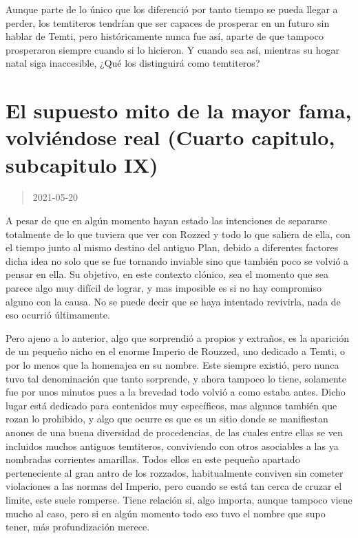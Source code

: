 \documentclass[
  spanish,
]{book}
\begin{document}
Aunque parte de lo único que los diferenció por tanto tiempo se pueda llegar a perder, los temtiteros tendrían que ser capaces de prosperar en un futuro sin hablar de Temti, pero históricamente nunca fue así, aparte de que tampoco prosperaron siempre cuando si lo hicieron. Y cuando sea así, mientras su hogar natal siga inaccesible, ¿Qué los distinguirá como temtiteros?

\hypertarget{el-supuesto-mito-de-la-mayor-fama-volviuxe9ndose-real-cuarto-capitulo-subcapitulo-ix}{%
\section{El supuesto mito de la mayor fama, volviéndose real (Cuarto capitulo, subcapitulo IX)}\label{el-supuesto-mito-de-la-mayor-fama-volviuxe9ndose-real-cuarto-capitulo-subcapitulo-ix}}

\begin{quote}
2021-05-20
\end{quote}

A pesar de que en algún momento hayan estado las intenciones de separarse totalmente de lo que tuviera que ver con Rozzed y todo lo que saliera de ella, con el tiempo junto al mismo destino del antiguo Plan, debido a diferentes factores dicha idea no solo que se fue tornando inviable sino que también poco se volvió a pensar en ella. Su objetivo, en este contexto clónico, sea el momento que sea parece algo muy difícil de lograr, y mas imposible es si no hay compromiso alguno con la causa. No se puede decir que se haya intentado revivirla, nada de eso ocurrió últimamente.

Pero ajeno a lo anterior, algo que sorprendió a propios y extraños, es la aparición de un pequeño nicho en el enorme Imperio de Rouzzed, uno dedicado a Temti, o por lo menos que la homenajea en su nombre. Este siempre existió, pero nunca tuvo tal denominación que tanto sorprende, y ahora tampoco lo tiene, solamente fue por unos minutos pues a la brevedad todo volvió a como estaba antes.
Dicho lugar está dedicado para contenidos muy específicos, mas algunos también que rozan lo prohibido, y algo que ocurre es que es un sitio donde se manifiestan anones de una buena diversidad de procedencias, de las cuales entre ellas se ven incluidos muchos antiguos temtiteros, conviviendo con otros asociables a las ya nombradas corrientes amarillas. Todos ellos en este pequeño apartado perteneciente al gran antro de los rozzados, habitualmente conviven sin cometer violaciones a las normas del Imperio, pero cuando se está tan cerca de cruzar el limite, este suele romperse. Tiene relación si, algo importa, aunque tampoco viene mucho al caso, pero si en algún momento todo eso tuvo el nombre que supo tener, más profundización merece.
\end{document}
